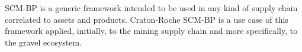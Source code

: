 
\acresetall 

\ac{SCM-BP} is a generic framework intended to be used in any kind of supply chain correlated to assets and products. 
Craton-Roche SCM-BP is a use case of this framework applied, initially, to the mining supply chain and more specifically, to the gravel ecosystem.



